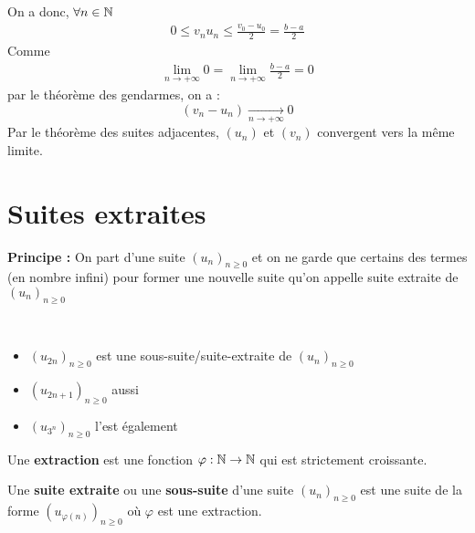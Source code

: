 \begin{exemple}
\begin{enumerate}
        On a donc, $\forall n \in \mathbb{N}$
        \begin{align*}
            0 \leq v_n u_n \leq \frac{v_0 - u_0}{2} = \frac{b - a}{2}
        \end{align*}
        Comme 
        \begin{align*}
            \lim_{n \to +\infty} 0 = \lim_{n \to +\infty} \frac{b - a}{2} = 0
        \end{align*}
        par le théorème des gendarmes, on a :
        \begin{equation*}
            (v_n - u_n) \xrightarrow[n \to +\infty]{} 0
        \end{equation*}
        Par le théorème des suites adjacentes, $(u_n)$ et $(v_n)$ convergent vers la même limite.
    \end{enumerate}
\end{exemple}
\clearpage
\section{Suites extraites}
\textbf{Principe :} On part d'une suite $(u_n)_{n \geq 0}$ et on ne garde que certains des termes (en nombre infini) pour former une nouvelle suite qu'on appelle suite extraite de $(u_n)_{n\geq 0}$

\begin{exemple}~ 
    \begin{itemize}
        \item $(u_{2n})_{n \geq 0}$ est une sous-suite/suite-extraite de $(u_n)_{n \geq 0}$
        \item $(u_{2n+1})_{n \geq 0}$ aussi
        \item $(u_{3^n})_{n \geq 0}$ l'est également
    \end{itemize}
\end{exemple}

\begin{graybox}
    \begin{definition}[Extraction]
Une \textbf{extraction} est une fonction $\varphi : \mathbb{N} \to \mathbb{N}$ qui est strictement croissante. 
\end{definition}
\end{graybox}

\begin{graybox}
    \begin{definition}
Une \textbf{suite extraite} ou une \textbf{sous-suite} d'une suite $(u_n)_{n \geq 0}$ est une suite de la forme $(u_{\varphi(n)})_{n \geq 0}$ où $\varphi$ est une extraction. 
\end{definition}
\end{graybox}


